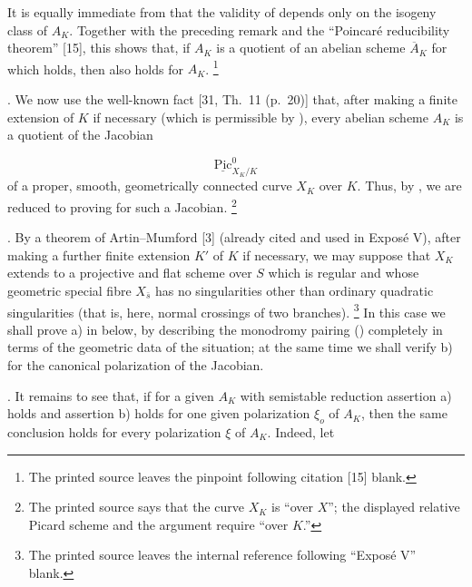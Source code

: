 It is equally immediate from  that the validity of  depends
only on the isogeny class of $A_K$. Together with the preceding remark
and the ``Poincar\'e reducibility theorem'' [15], this shows that, if
$A_K$ is a quotient of an abelian scheme $\overline A_K$ for which 
holds, then  also holds for $A_K$.
\footnote{The printed source leaves the pinpoint following citation [15]
blank.}

\smallskip
\noindent
{}. We now use the well-known fact [31, Th.~11 (p.~20)] that, after
making a finite extension of $K$ if necessary (which is permissible by
), every abelian scheme $A_K$ is a quotient of the Jacobian

\begin{equation*}
\underline{\operatorname{Pic}}^0_{X_K/K}
\end{equation*}
of a proper, smooth, geometrically connected curve $X_K$ over $K$.
Thus, by , we are reduced to proving  for such a Jacobian.
\footnote{The printed source says that the curve $X_K$ is ``over $X$'';
the displayed relative Picard scheme and the argument require ``over
$K$.''}

\smallskip
\noindent
{}. By a theorem of Artin--Mumford [3] (already cited and used in
Expos\'e V), after making a further finite extension $K'$ of $K$ if
necessary, we may suppose that $X_K$ extends to a projective and flat
scheme over $S$ which is regular and whose geometric special fibre
$X_{\bar s}$ has no singularities other than ordinary quadratic
singularities (that is, here, normal crossings of two branches).
\footnote{The printed source leaves the internal reference following
``Expos\'e V'' blank.}
In this case we shall prove  a) in  below, by describing the
monodromy pairing () completely in terms of the geometric data of
the situation; at the same time we shall verify  b) for the canonical
polarization of the Jacobian.

\smallskip
\noindent
{}. It remains to see that, if for a given $A_K$ with semistable
reduction assertion  a) holds and assertion  b) holds for one
given polarization $\xi_o$ of $A_K$, then the same conclusion holds for
every polarization $\xi$ of $A_K$. Indeed, let

